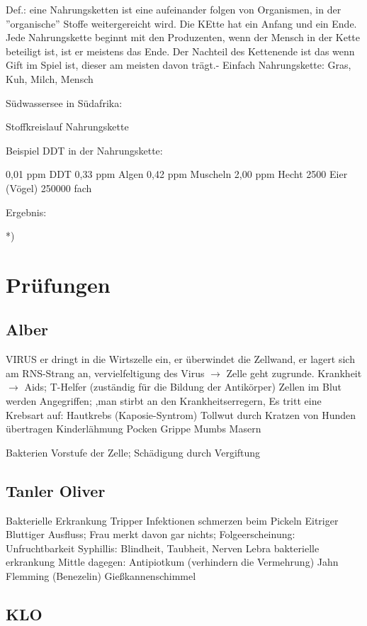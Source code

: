 \documentclass[a4paper]{article}
\begin{document}
Def.: eine Nahrungsketten ist eine aufeinander folgen von Organismen, in der ''organische'' Stoffe weitergereicht wird. Die KEtte hat ein Anfang und ein Ende. Jede Nahrungskette beginnt mit den Produzenten, wenn der Mensch in der Kette beteiligt ist, ist er meistens das Ende. Der Nachteil des Kettenende ist das wenn Gift im Spiel ist, dieser am meisten davon trägt.- Einfach Nahrungskette: Gras, Kuh, Milch, Mensch

Südwassersee in Südafrika:

Stoffkreislauf 
Nahrungskette

Beispiel DDT in der Nahrungskette:

0,01 ppm DDT
0,33 ppm Algen
0,42 ppm Muscheln
2,00 ppm Hecht
2500 Eier (Vögel)
250000 fach

Ergebnis:

	*) 

\newpage

\section{Prüfungen}

\subsection{Alber}

VIRUS er dringt in die Wirtszelle ein, er überwindet die Zellwand, er lagert sich am RNS-Strang an, vervielfeltigung des Virus $\rightarrow$ Zelle geht zugrunde. 
\newline
\newline
Krankheit $\rightarrow$ Aids; T-Helfer (zuständig für die Bildung der Antikörper) Zellen im Blut werden Angegriffen; ,man stirbt an den Krankheitserregern, Es tritt eine Krebsart auf: Hautkrebs (Kaposie-Syntrom)
\newline
\newline
Tollwut durch Kratzen von Hunden übertragen
Kinderlähmung
Pocken
Grippe
Mumbs
Masern

Bakterien Vorstufe der Zelle; Schädigung durch Vergiftung

\subsection{Tanler Oliver}

Bakterielle Erkrankung
\newline
\newline
Tripper
Infektionen schmerzen beim Pickeln
Eitriger Bluttiger Ausfluss; Frau merkt davon gar nichts; Folgeerscheinung: Unfruchtbarkeit
Syphillis: Blindheit, Taubheit, Nerven
Lebra bakterielle erkrankung 
Mittle dagegen: Antipiotkum (verhindern die Vermehrung) Jahn Flemming (Benezelin) Gießkannenschimmel

\subsection{KLO}
\end{document}
